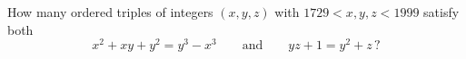 How many ordered triples of integers $(x,y,z)$ with $1729<x,y,z<1999$ satisfy both
\[x^2+xy+y^2=y^3-x^3\qquad\text{and}\qquad yz+1=y^2+z\,?\]
